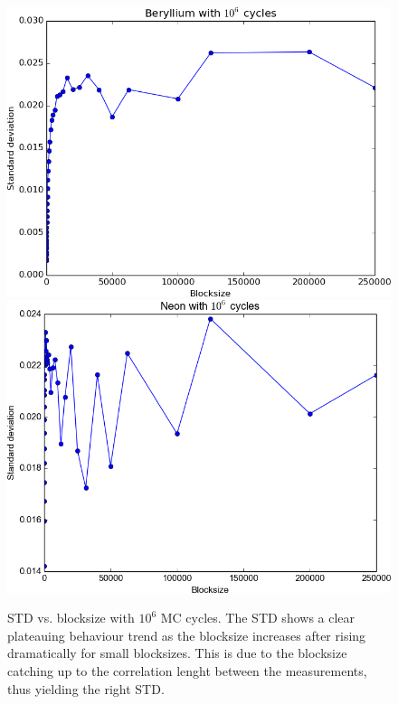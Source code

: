 		\begin{figure}
			\centering \includegraphics[width=0.45\linewidth]{../figures/Beryllium_blocking}
			\centering \includegraphics[width=0.45\linewidth]{../figures/Neon_blocking}
			\protect\caption{STD vs. blocksize with $10^6$ MC cycles. The STD shows a clear plateauing behaviour trend as the blocksize increases after rising dramatically for small blocksizes. This is due to the blocksize catching up to the correlation lenght between the measurements, thus yielding the right STD.}\label{fig01:std_Stuff}
		\end{figure}

